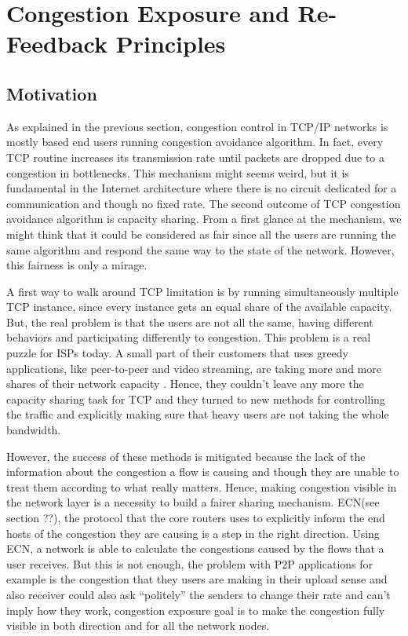 \section{Congestion Exposure and Re-Feedback Principles}
\subsection{Motivation}

As explained in the previous section, congestion control in TCP/IP networks is mostly based end users running congestion avoidance algorithm. In fact, every TCP routine increases its transmission rate until packets are dropped due to a congestion in bottlenecks. This mechanism might seems weird, but it is fundamental in the Internet architecture where there is no circuit dedicated for a communication and though no fixed rate. The second outcome of TCP congestion avoidance algorithm is capacity sharing. From a first glance at the mechanism, we might think that it could be considered as fair since all the users are  running the same algorithm and respond the same way to the state of the network. However, this fairness is only a mirage. 

A first way to walk around TCP limitation is by running simultaneously multiple TCP instance, since every instance gets an equal share of the available capacity. But, the real problem is that the users are not all the same, having different behaviors and participating differently to congestion. This problem is a real puzzle for ISPs today. A small part of their customers that uses greedy applications, like peer-to-peer and video streaming, are taking more and more shares of their network capacity \cite{RFC5594}.  Hence, they couldn't leave any more the capacity sharing task for TCP and they turned to new methods for controlling the traffic and explicitly making sure that heavy users are not taking the whole bandwidth. 

However, the success of these methods is mitigated because the lack of the information about the congestion a flow is causing and though they are unable to treat them according to what really matters. Hence, making congestion visible in the network layer is a necessity to build a fairer sharing mechanism. ECN(see section ??), the protocol that the core routers uses to explicitly inform the end hosts of the congestion they are causing is  a step in the right direction.  Using ECN, a network is able to calculate the congestions caused by the flows that a user receives. But this is not enough, the problem with P2P applications for example is the congestion that they users are making in their upload sense and also receiver could also ask “politely” the senders to change their rate and can't imply how they work,  congestion exposure goal is to make the congestion fully visible in both direction and for all the network nodes.

